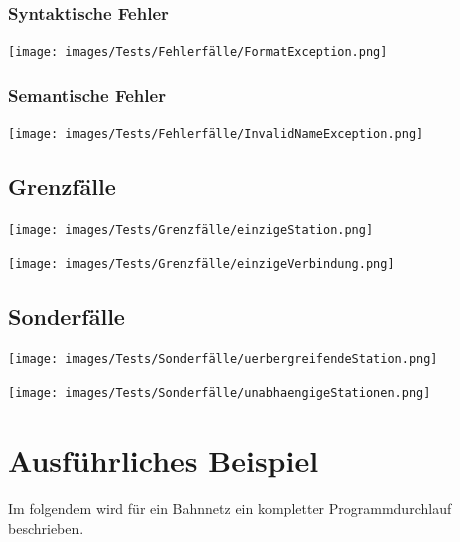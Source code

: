 \subsubsection{Syntaktische Fehler}\label{test:sec:syntaktische-fehler}
\begin{center}
    \texttt{[image: images/Tests/Fehlerfälle/FormatException.png]}
    \label{test:subsecpar:format-fehler}
\end{center}

\subsubsection{Semantische Fehler}\label{test:sec:semantische-fehler}
\begin{center}
    \texttt{[image: images/Tests/Fehlerfälle/InvalidNameException.png]}
    \label{test:subsecpar:namen-sind-nicht-erlaubt}
\end{center}

\subsection{Grenzfälle}\label{test:sec:grenzfaelle}

\begin{center}
    \texttt{[image: images/Tests/Grenzfälle/einzigeStation.png]}
    \label{test:subsecpar:einzige-station}
\end{center}

\begin{center}
    \texttt{[image: images/Tests/Grenzfälle/einzigeVerbindung.png]}
    \label{test:subsecpar:einzige}
\end{center}


\subsection{Sonderfälle}\label{test:sec:sonderfaelle}

\begin{center}
    \texttt{[image: images/Tests/Sonderfälle/uerbergreifendeStation.png]}
    \label{test:subsecpar:uerbergreifendeStation}
\end{center}

\begin{center}
    \texttt{[image: images/Tests/Sonderfälle/unabhaengigeStationen.png]}
    \label{test:subsecpar:unabhaengigeStationen}
\end{center}


\section{Ausführliches Beispiel}\label{test:sec:ausfuehrliches-beispiel}
Im folgendem wird für ein Bahnnetz ein kompletter Programmdurchlauf beschrieben.\\

